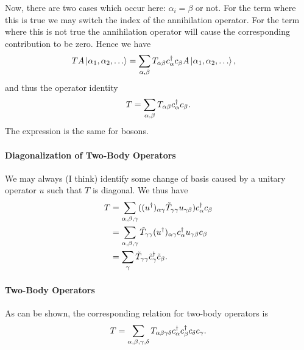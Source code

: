 Now, there are two cases which occur here: $\alpha_{i} = \beta$ or not. For the term where this is true we may switch the index of the annihilation operator. For the term where this is not true the annihilation operator will cause the corresponding contribution to be zero. Hence we have
\begin{align*}
	TA\ket{\alpha_{1}, \alpha_{2}, \dots} &= \sum\limits_{\alpha, \beta}T_{\alpha\beta}c_{\alpha}^{\dagger}c_{\beta}A\ket{\alpha_{1}, \alpha_{2}, \dots},
\end{align*}
and thus the operator identity
\begin{align*}
	T = \sum\limits_{\alpha, \beta}T_{\alpha\beta}c_{\alpha}^{\dagger}c_{\beta}.
\end{align*}
The expression is the same for bosons.

\paragraph{Diagonalization of Two-Body Operators}
We may always (I think) identify some change of basis caused by a unitary operator $u$ such that $T$ is diagonal. We thus have
\begin{align*}
	T &= \sum\limits_{\alpha, \beta, \gamma}((u^{\dagger})_{\alpha\gamma}\tilde{T}_{\gamma\gamma}u_{\gamma\beta})c_{\alpha}^{\dagger}c_{\beta} \\
	  &= \sum\limits_{\alpha, \beta, \gamma}\tilde{T}_{\gamma\gamma}(u^{\dagger})_{\alpha\gamma}c_{\alpha}^{\dagger}u_{\gamma\beta}c_{\beta} \\
	  &= \sum\limits_{\gamma}\tilde{T}_{\gamma\gamma}\tilde{c}_{\gamma}^{\dagger}\tilde{c}_{\beta}.
\end{align*}

\paragraph{Two-Body Operators}
As can be shown, the corresponding relation for two-body operators is
\begin{align*}
	T = \sum\limits_{\alpha, \beta, \gamma, \delta}T_{\alpha\beta\gamma\delta}c_{\alpha}^{\dagger}c_{\beta}^{\dagger}c_{\delta}c_{\gamma}.
\end{align*}

